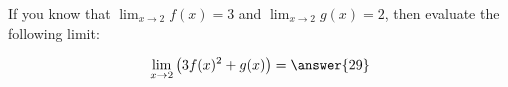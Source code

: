 \documentclass{ximera}
\author{Steven Gubkin}
\begin{document}
\begin{exercise}

	If you know that $\displaystyle \lim_{x \to 2} f(x) = 3$ and $\displaystyle \lim_{x \to 2} g(x) = 2$, then evaluate the following limit:
	
	\[
		\lim_{x \to 2} \left( 3 f(x)^2 + g(x) \right) = \answer{29}
	\]
	
\end{exercise}
\end{document}
